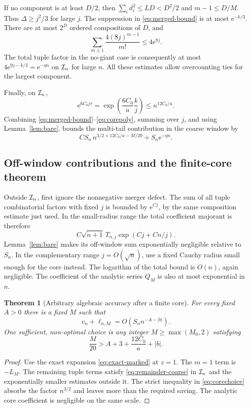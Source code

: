 \documentclass[11pt,a4paper]{article}
\numberwithin{equation}{section}
\newtheorem{theorem}{Theorem}[section]
\theoremstyle{definition}
\theoremstyle{remark}\newtheorem{remark}[theorem]{Remark}
\newcommand{\ee}{\mathrm e}\newcommand{\dd}{\mathrm d}
\begin{document}
If no component is at least $D/2$, then
$\sum_i d_i^2\le LD<D^2/2$ and $m-1\le D/M$.
Thus $\Delta\ge j^2/3$ for large $j$. The suppression in
\eqref{eq:merged-bound} is at most $\ee^{-k/3}$.
There are at most $2^D$ ordered compositions of $D$, and
\[
 \sum_{m\ge1}\frac{4(8j)^{m-1}}{m!}\le4\ee^{8j}.
\]
The total tuple factor in the no-giant case is consequently at most
$4\ee^{9j-k/3}=\ee^{-\eta n}$ on $\mathcal I_n$ for large $n$.
All these estimates allow overcounting ties for the largest component.

Finally, on $\mathcal I_n$,
\begin{equation}
 \ee^{6C_0j\tau}
 =\exp\!\left(\frac{6C_0}a\frac{k}j\right)
 \le n^{12C_0/a}.
 \label{eq:corepoly}
\end{equation}
Combining \eqref{eq:merged-bound}--\eqref{eq:corepoly}, summing over $j$,
and using Lemma~\ref{lem:bare}, bounds the multi-tail contribution in the
coarse window by
\begin{equation}
 C S_n\,n^{3/2+12C_0/a-M/20}+S_n\ee^{-\eta n}.
 \label{eq:remainder-coarse}
\end{equation}

\subsection{Off-window contributions and the finite-core theorem}
Outside $\mathcal I_n$, first ignore the nonnegative merger defect. The sum of all
tuple combinatorial factors with fixed $j$ is bounded by $\ee^{Cj}$, by the
same composition estimate just used. In the small-radius range the total
coefficient majorant is therefore
\[
 C\sqrt{n+1}\,T_{n,j}\exp(Cj+Cn/j).
\]
Lemma~\ref{lem:bare} makes its off-window sum exponentially negligible
relative to $S_n$. In the complementary range $j=O(\sqrt n)$, use a fixed
Cauchy radius small enough for the core instead. The logarithm of the total
bound is $O(n)$, again negligible. The coefficient of the analytic series
$Q_M$ is also at most exponential in $n$.

\begin{theorem}[Arbitrary algebraic accuracy after a finite core]
\label{thm:reduction}
For every fixed $A>0$ there is a fixed $M$ such that
\begin{equation}
 \boxed{\displaystyle
 v_n+\ell_{n,M}=O\!\left(S_n n^{-A-|b|}\right).}
 \label{eq:finite-accuracy}
\end{equation}
One sufficient, non-optimal choice is any integer $M\ge\max(M_0,2)$ satisfying
\begin{equation}
 \frac M{20}>A+3+\frac{12C_0}{a}+|b|.
 \label{eq:corechoice}
\end{equation}
\end{theorem}
\begin{proof}
Use the exact expansion \eqref{eq:exact-marked} at $z=1$.
The $m=1$ term is $-L_M$. The remaining tuple terms satisfy
\eqref{eq:remainder-coarse} in $\mathcal I_n$ and the exponentially smaller
estimates outside it. The strict inequality in \eqref{eq:corechoice}
absorbs the factor $n^{3/2}$ and leaves more than the required saving.
The analytic core coefficient is negligible on the same scale.
\end{proof}
\end{document}
